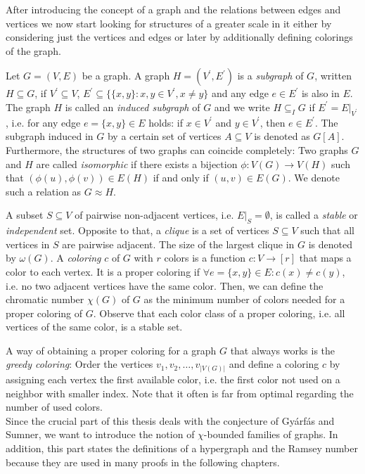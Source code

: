 After introducing the concept of a graph and the relations between edges and vertices we now start looking for structures of a greater scale in it either by considering just the vertices and edges or later by additionally defining colorings of the graph. 

Let $G=(V,E)$ be a graph. A graph $H=(V^\prime ,E^\prime )$ is a \textit{subgraph} of $G$, written $H\subseteq G$, if $V^\prime\subseteq V$, $E^\prime\subseteq \lbrace \lbrace x,y\rbrace : x,y\in V^\prime, x\neq y\rbrace$ and any edge $e\in E^\prime$ is also in $E$. The graph $H$ is called an \textit{induced subgraph} of $G$ and we write $H\subseteq_I G$ if $E^\prime = E\vert_{V^\prime}$, i.e. for any edge $e=\lbrace x,y\rbrace\in E$ holds: if $x\in V^\prime$ and $y\in V^\prime$, then $e\in E^\prime$. The subgraph induced in $G$ by a certain set of vertices $A\subseteq V$ is denoted as $G[A]$. Furthermore, the structures of two graphs can coincide completely: Two graphs $G$ and $H$ are called \textit{isomorphic} if there exists a bijection $\phi :V(G)\to V(H)$ such that $(\phi (u), \phi (v))\in E(H)$ if and only if $(u, v)\in E(G)$. We denote such a relation as $G\approx H$.

A subset $S\subseteq V$ of pairwise non-adjacent vertices, i.e. $E\vert_S =\emptyset$, is called a \textit{stable} or \textit{independent} set. Opposite to that, a \textit{clique} is a set of vertices $S\subseteq V$ such that all vertices in $S$ are pairwise adjacent. The size of the largest clique in $G$ is denoted by $\omega (G)$. A \textit{coloring} $c$ of $G$ with $r$ colors is a function $c:V\to [r]$ that maps a color to each vertex. It is a proper coloring if $\forall e = \lbrace x,y\rbrace\in E: c(x)\neq c(y)$, i.e. no two adjacent vertices have the same color. Then, we can define the chromatic number $\chi (G)$ of $G$ as the minimum number of colors needed for a proper coloring of $G$. Observe that each color class of a proper coloring, i.e. all vertices of the same color, is a stable set.

A way of obtaining a proper coloring for a graph $G$ that always works is the \textit{greedy coloring}: Order the vertices $v_1, v_2, \dots ,v_{\vert V(G) \vert }$ and define a coloring $c$ by assigning each vertex the first available color, i.e. the first color not used on a neighbor with smaller index. Note that it often is far from optimal regarding the number of used colors.\\

Since the crucial part of this thesis deals with the conjecture of Gyárfás and Sumner, we want to introduce the notion of $\chi$-bounded families of graphs. In addition, this part states the definitions of a hypergraph and the Ramsey number because they are used in many proofs in the following chapters.


